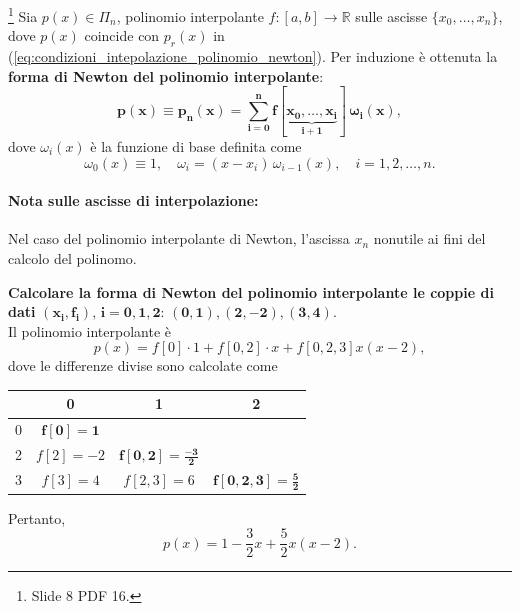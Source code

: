 \begin{remark}\label{rem:polinomio_interpolante_forma_newton}\footnote{Slide 8 PDF 16.}
    Sia $p(x)\in\Pi_n$, polinomio interpolante $f:[a,b]\rightarrow\mathbb{R}$ sulle ascisse $\{x_0,\hdots, x_n\}$, dove $p(x)$ coincide con $p_r(x)$ in (\ref{eq:condizioni_intepolazione_polinomio_newton}).
    Per induzione è ottenuta la \textbf{forma di Newton del polinomio interpolante}: 
    \begin{equation}\label{eq:polinomio_interpolante_newton}
        \boldsymbol{p(x)\equiv p_n(x) = \sum_{i=0}^{n} f[\underbrace{x_0,\hdots, x_i}_{i+1}]\,\omega_i(x)},
    \end{equation}
    dove $\omega_i(x)$ è la funzione di base definita come
    \begin{equation*}
    	\omega_0(x)\equiv 1, \quad \omega_i=(x-x_i)\,\omega_{i-1}(x),\quad i=1,2,\hdots, n.
    \end{equation*}
\end{remark}

\paragraph{Nota sulle ascisse di interpolazione:} Nel caso del polinomio interpolante di Newton, l'ascissa $x_n$ nonutile ai fini del calcolo del polinomo.

\begin{example}
	\textbf{Calcolare la forma di Newton del polinomio interpolante le coppie di dati} $\boldsymbol{(x_i, f_i),\, i=0,1,2}$: $\boldsymbol{(0,1),(2,-2), (3,4)}$.\\
	Il polinomio interpolante è
	\begin{equation*}
		p(x) = f[0]\cdot 1 + f[0,2]\cdot x + f[0,2,3] x(x-2),
	\end{equation*}
	dove le differenze divise sono calcolate come
	\begin{center}
		\begin{tabular}{c|c|c|c} 
			& 0 & 1 & 2\\
			\hline
			0 & $\boldsymbol{f[0]=1}$ & &   \\ 
			2 & $f[2]=-2$ & $\boldsymbol{f[0,2]=\frac{-3}{2}}$ & \\ 
			3 & $f[3]=4$ & $f[2,3]=6$ & $\boldsymbol{f[0,2,3]=\frac{5}{2}}$
		\end{tabular}
	\end{center}
	Pertanto,
	\begin{equation*}
		p(x) = 1 - \frac{3}{2} x + \frac{5}{2} x(x-2).
	\end{equation*}
\end{example}
